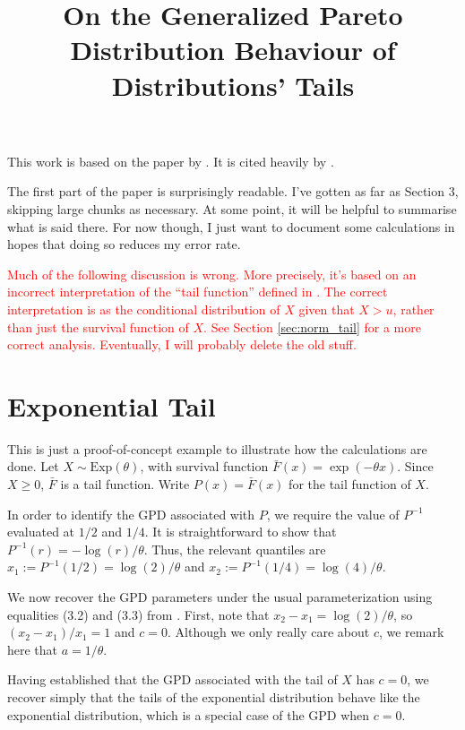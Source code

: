 \documentclass{article}
\title{On the Generalized Pareto Distribution Behaviour of Distributions' Tails}
\date{}
\begin{document}
\maketitle

This work is based on the paper by \citet{Pic75}. It is cited heavily by \citet{Veh22}.

The first part of the paper is surprisingly readable. I've gotten as far as Section 3, skipping large chunks as necessary. At some point, it will be helpful to summarise what is said there. For now though, I just want to document some calculations in hopes that doing so reduces my error rate.

\textcolor{red}{Much of the following discussion is wrong. More precisely, it's based on an incorrect interpretation of the ``tail function'' defined in \citet{Pic75}. The correct interpretation is as the conditional distribution of $X$ given that $X > u$, rather than just the survival function of $X$. See Section \ref{sec:norm_tail} for a more correct analysis. Eventually, I will probably delete the old stuff.}

\section{Exponential Tail}

This is just a proof-of-concept example to illustrate how the calculations are done. Let $X \sim \mathrm{Exp}(\theta)$, with survival function $\bar{F}(x) = \exp(-\theta x)$. Since $X \geq 0$, $\bar{F}$ is a tail function. Write $P(x) = \bar{F}(x)$ for the tail function of $X$.

In order to identify the GPD associated with $P$, we require the value of $P^{-1}$ evaluated at $1/2$ and $1/4$. It is straightforward to show that $P^{-1}(r) = - \log(r)/\theta$. Thus, the relevant quantiles are $x_1 := P^{-1}(1/2) = \log(2)/\theta$ and $x_2 := P^{-1}(1/4) = \log(4)/\theta$.

We now recover the GPD parameters under the usual parameterization using equalities (3.2) and (3.3) from \citet{Pic75}. First, note that $x_2 - x_1 = \log(2)/\theta$, so $(x_2 - x_1)/x_1 = 1$ and $c=0$. Although we only really care about $c$, we remark here that $a = 1/\theta$.

Having established that the GPD associated with the tail of $X$ has $c=0$, we recover simply that the tails of the exponential distribution behave like the exponential distribution, which is a special case of the GPD when $c=0$.
\end{document}
